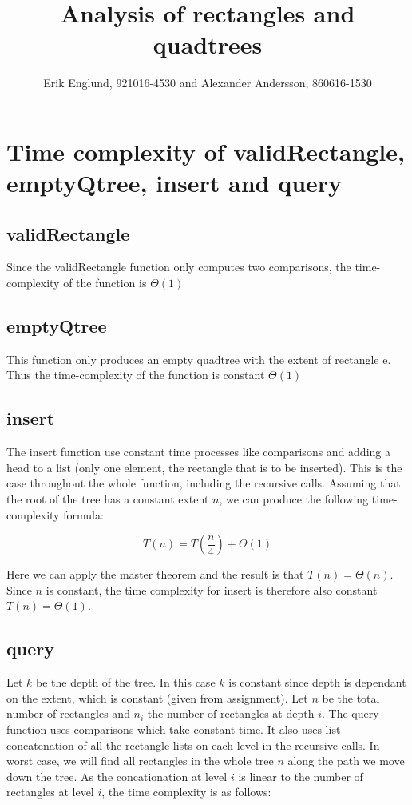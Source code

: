 \documentclass[12pt, a4paper]{article}
\title{Analysis of rectangles and quadtrees}
\author{Erik Englund, 921016-4530 and Alexander Andersson, 860616-1530}
\begin{document}
\maketitle

\section{Time complexity of validRectangle, emptyQtree, insert and query}

\subsection{validRectangle}

Since the validRectangle function only computes two comparisons, the time-complexity of the function is 
$\Theta(1)$




\subsection{emptyQtree}

This function only produces an empty quadtree with the extent of rectangle e. Thus the time-complexity of the function is constant $\Theta(1)$



\subsection{insert}

The insert function use constant time processes like comparisons and adding a head to a list (only one element, the rectangle that is to be inserted). This is the case throughout the whole function, including the recursive calls. Assuming that the root of the tree has a constant extent $n$, we can produce the following time-complexity formula:

$$T(n)=T\left(\frac{n}{4}\right)+\Theta(1)$$

Here we can apply the master theorem and the result is that $T(n)=\Theta(n)$. Since $n$ is constant, the time complexity for insert is therefore also constant $T(n) = \Theta(1)$.



\subsection{query}


Let $k$ be the depth of the tree. In this case $k$ is constant since depth is dependant on the extent, which is constant (given from assignment). Let $n$ be the total number of rectangles and $n_i$ the number of rectangles at depth $i$.
The query function uses comparisons which take constant time. It also uses list concatenation of all the rectangle lists on each level in the recursive calls. In worst case, we will find all rectangles in the whole tree $n$ along the path we move down the tree. As the concationation at level $i$ is linear to the number of rectangles at level $i$, the time complexity is as follows:
\end{document}
